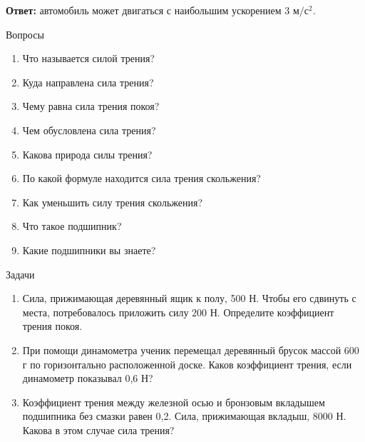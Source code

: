 \documentclass[a5paper, 10pt]{diss_4}
\renewcommand{\'}{\,'}
\begin{document}
\textbf{Ответ:} автомобиль может двигаться с наибольшим ускорением 3 $м/с^2$.

\begin{center}
   Вопросы
\end{center}
\begin{enumerate}
\item Что называется силой трения?
\item Куда направлена сила трения?
\item Чему равна сила трения покоя?
\item Чем обусловлена сила трения?
\item Какова природа силы трения?
\item По какой формуле находится сила трения скольжения?
\item Как уменьшить силу трения скольжения?
\item Что такое подшипник?
\item Какие подшипники вы знаете?
\end{enumerate}

\begin{center}
   Задачи
\end{center}
\begin{enumerate}

\item Сила, прижимающая деревянный ящик к полу, 500 Н. Чтобы его сдвинуть с места, потребовалось приложить силу 200 Н. Определите коэффициент трения покоя.

\item При помощи динамометра ученик перемещал деревянный брусок массой 600 г по горизонтально расположенной доске. Каков коэффициент трения, если динамометр показывал 0,6 Н?

\item Коэффициент трения между железной осью и бронзовым вкладышем подшипника без смазки равен 0,2. Сила, прижимающая вкладыш, 8000 Н. Какова в этом случае сила трения?

\end{enumerate}
\end{document}
